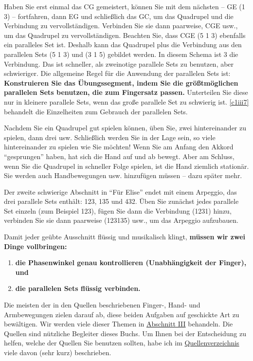 Haben Sie erst einmal das CG gemeistert, können Sie mit dem nächsten -- GE (1 3) -- fortfahren, dann EG und schließlich das GC, um das Quadrupel und die Verbindung zu vervollständigen.
Verbinden Sie sie dann paarweise, CGE usw., um das Quadrupel zu vervollständigen.
Beachten Sie, dass CGE (5 1 3) ebenfalls ein paralleles Set ist.
Deshalb kann das Quadrupel plus die Verbindung aus den parallelen Sets (5 1 3) und (3 1 5) gebildet werden.
In diesem Schema ist 3 die Verbindung.
Das ist schneller, als zweinotige parallele Sets zu benutzen, aber schwieriger.
Die allgemeine Regel für die Anwendung der parallelen Sets ist: \textbf{Konstruieren Sie das Übungssegment, indem Sie die größtmöglichen parallelen Sets benutzen, die zum Fingersatz passen.}
Unterteilen Sie diese nur in kleinere parallele Sets, wenn das große parallele Set zu schwierig ist.
\hyperref[c1iii7]{\autoref{c1iii7}} behandelt die Einzelheiten zum Gebrauch der parallelen Sets.

Nachdem Sie ein Quadrupel gut spielen können, üben Sie, zwei hintereinander zu spielen, dann drei usw.
Schließlich werden Sie in der Lage sein, so viele hintereinander zu spielen wie Sie möchten!
Wenn Sie am Anfang den Akkord \enquote{gesprungen} haben, hat sich die Hand auf und ab bewegt.
Aber am Schluss, wenn Sie die Quadrupel in schneller Folge spielen, ist die Hand ziemlich stationär.
Sie werden auch Handbewegungen usw. hinzufügen müssen -- dazu später mehr.

Der zweite schwierige Abschnitt in \enquote{Für Elise} endet mit einem Arpeggio, das drei parallele Sets enthält: 123, 135 und 432.
Üben Sie zunächst jedes parallele Set einzeln (zum Beispiel 123), fügen Sie dann die Verbindung (1231) hinzu, verbinden Sie sie dann paarweise (123135) usw., um das Arpeggio aufzubauen.

Damit jeder geübte Ausschnitt flüssig und musikalisch klingt, \textbf{müssen wir zwei Dinge vollbringen:}

\begin{enumerate}[label={\arabic*.}] 
\item \textbf{die Phasenwinkel genau kontrollieren (Unabhängigkeit der Finger), und}
\item \textbf{die parallelen Sets flüssig verbinden.}
 \end{enumerate}

Die meisten der in den Quellen beschriebenen Finger-, Hand- und Armbewegungen zielen darauf ab, diese beiden Aufgaben auf geschickte Art zu bewältigen.
Wir werden viele dieser Themen in \hyperref[c1iii1]{Abschnitt III} behandeln.
Die Quellen sind nützliche Begleiter dieses Buchs.
Um Ihnen bei der Entscheidung zu helfen, welche der Quellen Sie benutzen sollten, habe ich im \hyperref[reference]{Quellenverzeichnis} viele davon (sehr kurz) beschrieben.

